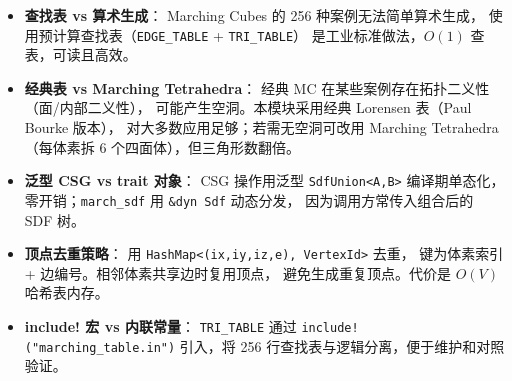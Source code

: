 \documentclass[11pt,a4paper]{article}
\begin{document}
\begin{itemize}
  \item \textbf{查找表 vs 算术生成}：
        Marching Cubes 的 256 种案例无法简单算术生成，
        使用预计算查找表（\texttt{EDGE\_TABLE} + \texttt{TRI\_TABLE}）
        是工业标准做法，$O(1)$ 查表，可读且高效。

  \item \textbf{经典表 vs Marching Tetrahedra}：
        经典 MC 在某些案例存在拓扑二义性（面/内部二义性），
        可能产生空洞。本模块采用经典 Lorensen 表（Paul Bourke 版本），
        对大多数应用足够；若需无空洞可改用 Marching Tetrahedra
        （每体素拆 6 个四面体），但三角形数翻倍。

  \item \textbf{泛型 CSG vs trait 对象}：
        CSG 操作用泛型 \texttt{SdfUnion<A,B>} 编译期单态化，
        零开销；\texttt{march\_sdf} 用 \texttt{\&dyn Sdf} 动态分发，
        因为调用方常传入组合后的 SDF 树。

  \item \textbf{顶点去重策略}：
        用 \texttt{HashMap<(ix,iy,iz,e), VertexId>} 去重，
        键为体素索引 + 边编号。相邻体素共享边时复用顶点，
        避免生成重复顶点。代价是 $O(V)$ 哈希表内存。

  \item \textbf{include! 宏 vs 内联常量}：
        \texttt{TRI\_TABLE} 通过 \texttt{include!("marching\_table.in")}
        引入，将 256 行查找表与逻辑分离，便于维护和对照验证。
\end{itemize}
\end{document}
